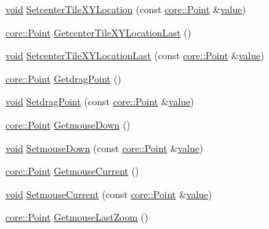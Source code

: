 \begin{DoxyCompactItemize}
\hyperlink{group___u_a_v_objects_plugin_ga444cf2ff3f0ecbe028adce838d373f5c}{void} \hyperlink{group___o_p_map_widget_gac19546f7c53493b741f4ffccdeb42214}{Setcenter\-Tile\-X\-Y\-Location} (const \hyperlink{structcore_1_1_point}{core\-::\-Point} \&\hyperlink{glext_8h_aa0e2e9cea7f208d28acda0480144beb0}{value})
\item 
\hyperlink{structcore_1_1_point}{core\-::\-Point} \hyperlink{group___o_p_map_widget_ga616220d474720ed46411357fb48ce323}{Getcenter\-Tile\-X\-Y\-Location\-Last} ()
\item 
\hyperlink{group___u_a_v_objects_plugin_ga444cf2ff3f0ecbe028adce838d373f5c}{void} \hyperlink{group___o_p_map_widget_ga3e20d2d38fb1001ab294401f10798932}{Setcenter\-Tile\-X\-Y\-Location\-Last} (const \hyperlink{structcore_1_1_point}{core\-::\-Point} \&\hyperlink{glext_8h_aa0e2e9cea7f208d28acda0480144beb0}{value})
\item 
\hyperlink{structcore_1_1_point}{core\-::\-Point} \hyperlink{group___o_p_map_widget_ga3e7f3a15092c88e62abd7ae055b83ca9}{Getdrag\-Point} ()
\item 
\hyperlink{group___u_a_v_objects_plugin_ga444cf2ff3f0ecbe028adce838d373f5c}{void} \hyperlink{group___o_p_map_widget_ga26fe0b642c132f54f8b89fcca245559d}{Setdrag\-Point} (const \hyperlink{structcore_1_1_point}{core\-::\-Point} \&\hyperlink{glext_8h_aa0e2e9cea7f208d28acda0480144beb0}{value})
\item 
\hyperlink{structcore_1_1_point}{core\-::\-Point} \hyperlink{group___o_p_map_widget_ga876eaa6494c4f0ca0a57b04aca2b63a7}{Getmouse\-Down} ()
\item 
\hyperlink{group___u_a_v_objects_plugin_ga444cf2ff3f0ecbe028adce838d373f5c}{void} \hyperlink{group___o_p_map_widget_ga393d5a89d61e2207a9cf54cd7a7e86db}{Setmouse\-Down} (const \hyperlink{structcore_1_1_point}{core\-::\-Point} \&\hyperlink{glext_8h_aa0e2e9cea7f208d28acda0480144beb0}{value})
\item 
\hyperlink{structcore_1_1_point}{core\-::\-Point} \hyperlink{group___o_p_map_widget_ga4d84ca5c68011460943e7cb0a2d9ecaa}{Getmouse\-Current} ()
\item 
\hyperlink{group___u_a_v_objects_plugin_ga444cf2ff3f0ecbe028adce838d373f5c}{void} \hyperlink{group___o_p_map_widget_ga5e6d344e7c74efe498222b7a343e4a80}{Setmouse\-Current} (const \hyperlink{structcore_1_1_point}{core\-::\-Point} \&\hyperlink{glext_8h_aa0e2e9cea7f208d28acda0480144beb0}{value})
\item 
\hyperlink{structcore_1_1_point}{core\-::\-Point} \hyperlink{group___o_p_map_widget_gac8e4aec0ad2357d32955a5cd6896d330}{Getmouse\-Last\-Zoom} ()

\end{DoxyCompactItemize}
